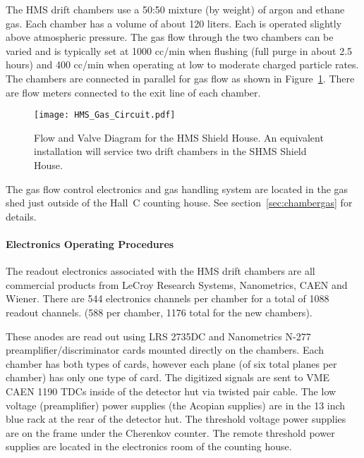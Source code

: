 {The HMS drift chambers use a 50:50 mixture (by weight) of argon and
ethane gas.  Each chamber has a volume of about 120 liters.  Each is
operated slightly above atmospheric pressure.  The gas flow through
the two chambers can be varied and is typically set at 1000 cc/min
when flushing (full purge in about 2.5 hours) and 400 cc/min when operating
at low to moderate charged particle rates.  The chambers are connected
in parallel for gas flow as shown in Figure~\ref{fig:HMS_flow}.  There are flow
meters connected to the exit line of each chamber.

\begin{figure}
\begin{center}
\texttt{[image: HMS\_Gas\_Circuit.pdf]}
\caption{Flow and Valve Diagram for the HMS Shield House. An equivalent
installation will service two drift chambers in the SHMS Shield House.}
\label{fig:HMS_flow}
\end{center}
\end{figure}

The gas flow control electronics
and gas handling system are located in the gas shed just outside
of the Hall~C counting house.  See section~\ref{sec:chambergas} for details.

\paragraph{Electronics Operating Procedures}

The readout electronics associated with the HMS drift chambers are all
commercial products from LeCroy Research Systems, Nanometrics, CAEN
and Wiener.  There are 544 electronics channels per chamber for
a total of 1088 readout channels.  (588 per chamber, 1176 total
for the new chambers).

These anodes are read out using LRS 2735DC
and Nanometrics N-277 preamplifier/discriminator cards mounted directly
on the chambers.  Each chamber has both types of cards, however each plane
(of six total planes per chamber) has only one type of card.  The
digitized signals are sent to VME CAEN 1190 TDCs inside of the detector hut
via twisted pair cable.  The low voltage (preamplifier) power supplies
(the Acopian supplies)
are in the 13 inch blue rack at the rear of the detector hut.  The
threshold voltage power supplies are on the frame under the Cherenkov
counter.  The remote
threshold power supplies are located in the electronics room of the counting
house.

}
